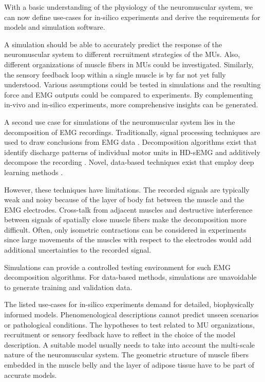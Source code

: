 With a basic understanding of the physiology of the neuromuscular system, we can now define use-cases for in-silico experiments and derive the requirements for models and simulation software.

A simulation should be able to accurately predict the response of the neuromuscular system to different recruitment strategies of the MUs. 
Also, different organizations of muscle fibers in MUs could be investigated. Similarly, the sensory feedback loop within a single muscle is by far not yet fully understood. Various assumptions could be tested in simulations and the resulting force and EMG outputs could be compared to experiments. By  complementing in-vivo and in-silico experiments, more comprehensive insights can be generated.

A second use case for simulations of the neuromuscular system lies in the decomposition of EMG recordings. Traditionally, signal processing techniques are used to draw conclusions from EMG data \cite{Merletti2004,Farina2010}. Decomposition algorithms exist that identify discharge patterns of individual motor units in HD-sEMG and additively decompose the recording \cite{DeLuca2006,Nawab2010,holobar2007gradient}. 
Novel, data-based techniques exist that employ deep learning methods \cite{Clarke2021}.

However, these techniques have limitations. The recorded signals are typically weak and noisy because of the layer of body fat between the muscle and the EMG electrodes. Cross-talk from adjacent muscles and destructive interference between signals of spatially close muscle fibers make the decomposition more difficult. Often, only isometric contractions can be considered in experiments since large movements of the muscles with respect to the electrodes would add additional uncertainties to the recorded signal.

Simulations can provide a controlled testing environment for such EMG decomposition algorithms. For data-based methods, simulations are unavoidable to generate training and validation data.

The listed use-cases for in-silico experiments demand for detailed, biophysically informed models. Phenomenological descriptions cannot predict unseen scenarios or pathological conditions. The hypotheses to test related to MU organizations, recruitment or sensory feedback have to reflect in the choice of the model description.
A suitable model usually needs to take into account the multi-scale nature of the neuromuscular system. The geometric structure of muscle fibers embedded in the muscle belly and the layer of adipose tissue  have to be part of accurate models.


